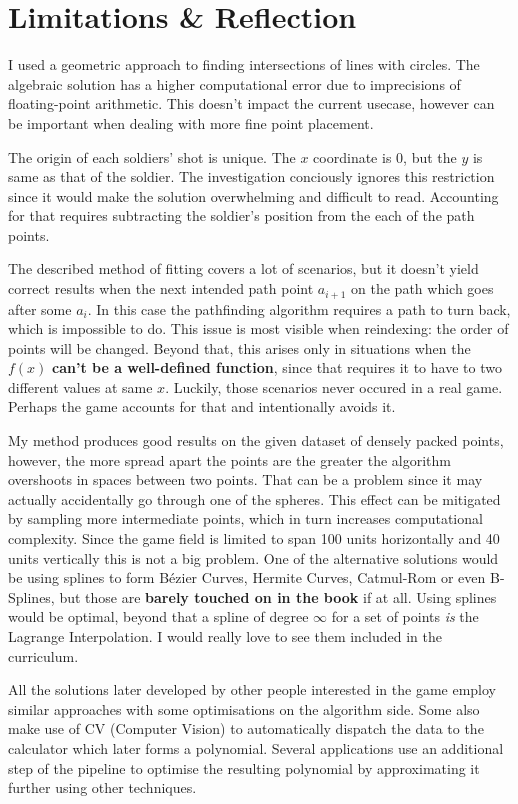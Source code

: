 \documentclass[12pt, titlepage]{article}
\begin{document}
\section{Limitations \& Reflection}
I used a geometric approach to finding intersections of lines with circles.
The algebraic solution has a higher computational error due to imprecisions 
of floating-point arithmetic. This doesn't impact the current usecase,
however can be important when dealing with more fine point placement.

The origin of each soldiers' shot is unique. The $x$ 
coordinate is $0$, but the $y$ is same as that of the soldier. The investigation
conciously ignores this restriction since it would make the solution overwhelming
and difficult to read. Accounting for that requires subtracting the soldier's 
position from the each of the path points.

The described method of fitting covers a lot of scenarios, but it doesn't yield 
correct results
when the next intended path point $a_{i + 1}$ on the path which goes after 
some $a_i$. In this case the pathfinding algorithm requires a path to turn back,
which is impossible to do. This issue is most visible when reindexing: the order
of points will be changed. Beyond that, this arises only in situations when the 
$f(x)$ \textbf{can't be a well-defined function}, since that requires it to have to
two different values at same $x$. Luckily, those scenarios never occured in a 
real game. Perhaps the game accounts for that and intentionally avoids it.

My method produces good results on the given dataset of densely packed points,
however, the more spread apart the points are the greater the algorithm
overshoots in spaces between two points. That can be a problem since it may 
actually accidentally go through one of the spheres. This effect can be
mitigated by sampling more intermediate points, which in turn increases 
computational complexity. Since the game field is  limited to span 100 units
horizontally and 40 units vertically this is not a big problem. One of the
alternative solutions would be using splines to form B\'{e}zier Curves, 
Hermite Curves, Catmul-Rom or even B-Splines, but those are \textbf{barely touched 
on in the book} if at all. Using splines would be optimal, beyond that
a spline of degree $\infty$ for a set of points \textit{is} the Lagrange
Interpolation. I would really love to see them included in the 
curriculum.

All the solutions later developed by other people interested in the game employ
similar approaches with some optimisations on the algorithm side. Some also
make use of CV (Computer Vision) to automatically dispatch the data to the
calculator which later forms a polynomial. Several applications use
an additional step of the pipeline to optimise the resulting polynomial
by approximating it further using other techniques.
\end{document}
